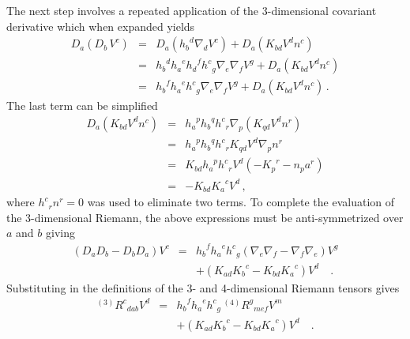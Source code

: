 \documentclass[twocolumn]{article}
\def\.{{\quad .}}
\begin{document}
The next step involves a repeated application of the 3-dimensional covariant
derivative which when expanded yields
\begin{eqnarray*}
  D_a \left( D_b \, V^c \right) & = &   D_a \left({h_b}^d \nabla _d V^c \right)
                                   + D_a \left(K_{bd} V^d n^c \right) \\
                             & = &   {h_b}^d {h_a}^e {h_d}^f {h^c}_g
                                     \nabla _e \nabla _f V^g
                                   + D_a \left(K_{bd} V^d n^c \right) \\
                             & = &   {h_b}^f {h_a}^e {h^c}_g
                                     \nabla _e \nabla _f V^g
                                   + D_a \left(K_{bd} V^d n^c \right) \,.
\end{eqnarray*}
The last term can be simplified
\begin{eqnarray*}
  D_a \left( K_{bd} V^d n^c \right) & = & {h_a}^p {h_b}^q {h^c}_r
                                          \nabla _p
                                          \left( K_{qd} V^d n^r \right) \\
                                    & = & {h_a}^p {h_b}^q {h^c}_r
                                          K_{qd} V^d \nabla _p n^r \\
                                    & = & K_{bd} {h_a}^p {h^c}_r V^d
                                          \left(-{K_p}^r - n_p a^r \right) \\
                                    & = & -K_{bd}{K_a}^c V^d \, ,
\end{eqnarray*}
where ${h^c}_r n^r = 0$ was used to eliminate two terms.
To complete the evaluation of the 3-dimensional Riemann, the above expressions
must be anti-symmetrized over $a$ and $b$ giving
\begin{eqnarray*}
 \left( D_{a}D_{b} - D_{b}D_{a} \right) V^c & = & {h_b}^f {h_a}^e {h^c}_g
                                                 \left(   \nabla _e \nabla _f
                                                        - \nabla _f \nabla _e
                                                 \right)  V^g \\
                                            &    &
                                                 +
                                                 \left(   K_{ad} {K_b}^c
                                                        - K_{bd} {K_a}^c
                                                 \right) V^d \.
\end{eqnarray*}
Substituting in the definitions of the 3- and 4-dimensional Riemann tensors
gives
\begin{eqnarray*}
 {}^{(3)} {R^c}_{dab} V^d & = & {h_b}^f {h_a}^e {h^c}_g \, {}^{(4)} {R^g}_{mef} V^m \\
                                            &    &
                                                 +
                                                 \left(   K_{ad} {K_b}^c
                                                        - K_{bd} {K_a}^c
                                                 \right) V^d \.
\end{eqnarray*}
\end{document}
